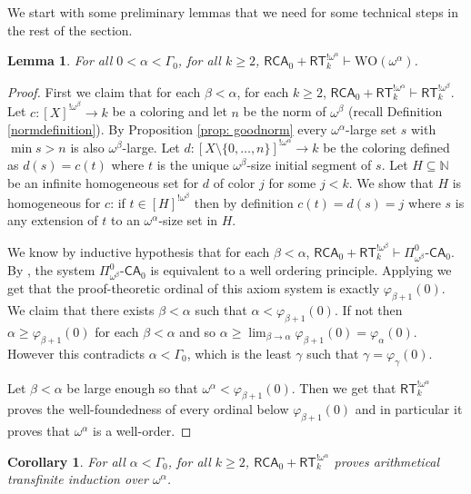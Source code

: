 \documentclass[11pt]{amsart}
\newtheorem{lemma}[thm]{Lemma}
\newtheorem{corollary}[thm]{Corollary}
\theoremstyle{definition}
\theoremstyle{remark}
\theoremstyle{plain}
\newcommand{\numberset}{\mathbb}
\newcommand{\N}{\numberset{N}}
\def\om{\omega}
\def\a{\alpha}
\def\b{\beta}
\def\G{\Gamma}
\def\g{\gamma}
\newcommand{\RCA}{\mathsf{RCA}_0}
\newcommand{\ACA}{\mathsf{ACA}_0}
\newcommand{\RT}{\mathsf{RT}}
\newcommand{\CA}{\mathsf{\text{-}CA}_0}
\def\WO{{\textrm{WO}}}
\def\N{{\mathbb{N}}}
\newcommand{\lorenzo}[1]{\textcolor{blue}{#1}}
\begin{document}
We start with some preliminary lemmas that we need for some technical steps in the rest of the section.

\begin{lemma}\label{wellorder a}
For all $0 < \alpha < \Gamma_0$, for all $k\geq 2$, $\RCA+\RT_k^{! \om^\a} \vdash \WO(\om^\a)$.
\end{lemma}
\begin{proof}
First we claim that for each $\b < \a$, for each $k\geq 2$, $\RCA+\RT_k^{! \om^\a} \vdash \RT_k^{! \om^\b}$.
Let $c \colon [X]^{! \om^\b} \to k$ be a coloring and let $n$ be the norm of $\om^\b$ (recall Definition \ref{normdefinition}).
By Proposition \ref{prop: goodnorm} every $\om^\a$-large set $s$ with $\min s > n$ is also $\om^\b$-large.
Let $d \colon [X \setminus \{0, \ldots, n\}]^{! \om^\a} \to k$ be the coloring defined as $d(s) = c(t)$ where $t$ is the unique $\om^\b$-size initial segment of $s$.
Let $H\subseteq\N$ be an infinite homogeneous set for $d$ of color $j$ for some $j < k$.
We show that $H$ is homogeneous for $c$: if $t \in [H]^{! \om^\b}$ then by definition $c(t) = d(s) = j$ where $s$ is any extension of $t$ to an $\om^\a$-size set in $H$.

We know by inductive hypothesis that for each $\b < \a$, $\RCA+\RT_k^{!\om^\b} \vdash \Pi^0_{\om^\b} \CA$.
By \cite[Theorem 6.16]{marconemontalban}, the system $\Pi^0_{\om^\b} \CA$ is equivalent to a well ordering principle.
Applying \cite[Theorem 1.5]{Arai2020} we get that the proof-theoretic ordinal of this axiom system is exactly $\varphi_{\b+1} (0)$.
We claim that there exists $\b < \a$ such that $\a < \varphi_{\b+1}(0)$.
If not then $\a \geq \varphi_{\b+1}(0)$ for each $\b < \a$ and so $\a \ge \lim_{\b \to \a} \varphi_{\b+1}(0) = \varphi_\a(0)$.
However this contradicts $\a < \G_0$, which is the least $\g$ such that $\g = \varphi_\g(0)$.

Let $\b < \a$ be large enough so that $\om^\a < \varphi_{\b+1}(0)$.
Then we get that $\RT_k^{!\om^\a}$ proves the well-foundedness of every ordinal below $\varphi_{\b+1}(0)$ and in particular it proves that $\om^\a$ is a well-order.
\end{proof}

\begin{corollary}\label{induction}
For all $\a<\G_0$, for all $k\geq 2$, $\RCA+\RT^{! \om^\a}_k$ proves arithmetical transfinite induction over $\om^\a$.
\end{corollary}
\end{document}
